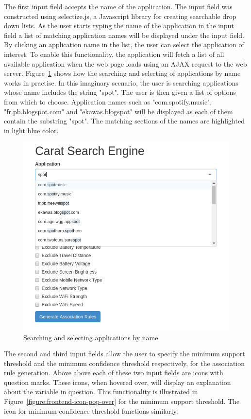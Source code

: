 The first input field accepts the name of the application. The input field was constructed using selectize.js, a Javascript library for creating searchable drop down lists. As the user starts typing the name of the application in the input field a list of matching application names will be displayed under the input field. By clicking an application name in the list, the user can select the application of interest. To enable this functionality, the application will fetch a list of all available application  when the web page loads using an AJAX request to the web server. Figure~\ref{figure:frontend-selectize} shows how the searching and selecting of applications by name works in practise. In this imaginary scenario, the user is searching applications whose name includes the string "spot". The user is then given a list of options from which to choose. Application names such as "com.spotify.music", "fr.pb.blogspot.com" and "ekawas.blogspot" will be displayed as each of them contain the substring "spot". The matching sections of the names are highlighted in light blue color.    

\begin{figure}[!htbp]
	\centering
	\includegraphics[width=\textwidth]{images/frontend/frontend_selectize.png}
	\caption{Searching and selecting applications by name}
	\label{figure:frontend-selectize}
\end{figure} 

The second and third input fields allow the user to specify the minimum support threshold and the minimum confidence threshold respectively, for the association rule generation. Above above each of these two input fields are icons with question marks. These icons, when hovered over, will display an explanation about the variable in question. This functionality is illustrated in Figure~\ref{figure:frontend-icon-pop-over} for the minimum support threshold. The icon for minimum confidence threshold functions similarly. 

